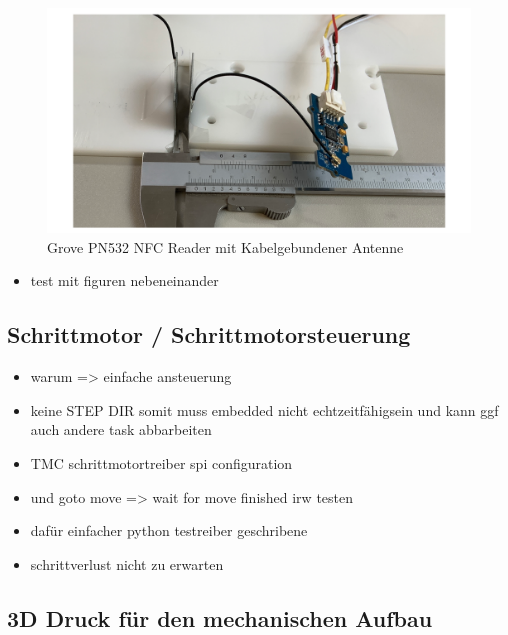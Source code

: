 \begin{figure}
\centering
\includegraphics{images/ATC_nfc_range_test.png}
\caption{Grove PN532 NFC Reader mit Kabelgebundener Antenne
\label{ATC_nfc_range_test}}
\end{figure}

\begin{itemize}
\tightlist
\item
  test mit figuren nebeneinander
\end{itemize}

\hypertarget{schrittmotor-schrittmotorsteuerung}{%
\subsection{Schrittmotor /
Schrittmotorsteuerung}\label{schrittmotor-schrittmotorsteuerung}}

\begin{itemize}
\tightlist
\item
  warum =\textgreater{} einfache ansteuerung
\item
  keine STEP DIR somit muss embedded nicht echtzeitfähigsein und kann
  ggf auch andere task abbarbeiten
\item
  TMC schrittmotortreiber spi configuration
\item
  und goto move =\textgreater{} wait for move finished irw testen
\item
  dafür einfacher python testreiber geschribene
\item
  schrittverlust nicht zu erwarten
\end{itemize}

\hypertarget{d-druck-fuxfcr-den-mechanischen-aufbau}{%
\subsection{3D Druck für den mechanischen
Aufbau}\label{d-druck-fuxfcr-den-mechanischen-aufbau}}

